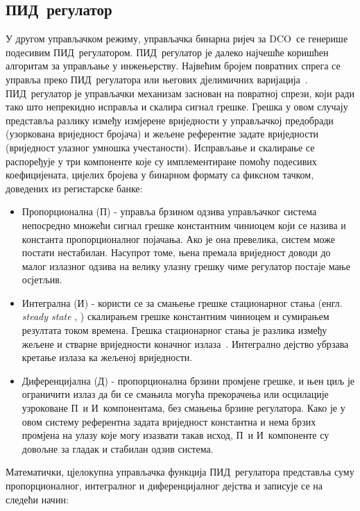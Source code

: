 \documentclass[master]{finthesis}
\makeatletter
\newcommand*{\engl}[2][\@empty]{%
    \edef\theacronym{#1}%
    (енгл. \foreignlanguage{english}{\emph{#2}%
    \ifx\theacronym\@empty \else , #1\fi})%
}
\def \DCO  {DCO} %
\def \PID  {ПИД} %
\def \P    {П}   %
\def \I    {И}   %
\def \D    {Д}   %
\makeatother
\begin{document}
\subsection{\PID\ регулатор} \label{section:pid}
У другом управљачком режиму, управљачка бинарна ријеч за \DCO\ се генерише подесивим \PID\ регулатором. \PID\ регулатор је далеко најчешће коришћен алгоритам за управљање у инжењерству. Највећим бројем повратних спрега се управља преко \PID\ регулатора или његових дјелимичних варијација~\cite{Astrom:PID_1995}. \PID\ регулатор је управљачки механизам заснован на повратној спрези, који ради тако што непрекидно исправља и скалира сигнал грешке. Грешка у овом случају представља разлику између измјерене вриједности у управљачкој предобради (узоркована вриједност бројача) и жељене референтне задате вриједности (вриједност улазног умношка учестаности). Исправљање и скалирање се распоређује у три компоненте које су имплементиране помоћу подесивих коефицијената, цијелих бројева у бинарном формату са фиксном тачком, доведених из регистарске банке: 
\begin{itemize}
	\item Пропорционална (\P) - управља брзином одзива управљачког система непосредно множећи сигнал грешке константним чиниоцем који се назива и константа пропорционалног појачања. Ако је она превелика, систем може постати нестабилан. Насупрот томе, њена премала вриједност доводи до малог излазног одзива на велику улазну грешку чиме регулатор постаје мање осјетљив. 
	\item Интегрална (\I) - користи се за смањење грешке стационарног стања \engl{steady state} скалирањем грешке константним чиниоцем и сумирањем резултата током времена. Грешка стационарног стања је разлика између жељене и стварне вриједности коначног излаза~\cite{Liptak:PROCESS_CONTROL_2006}. Интегрално дејство убрзава кретање излаза ка жељеној вриједности.
	\item Диференцијална (\D) - пропорционална брзини промјене грешке, и њен циљ је ограничити излаз да би се смањила могућа прекорачења или осцилације узроковане \P\ и \I\ компонентама, без смањења брзине регулатора. Како је у овом систему референтна задата вриједност константна и нема брзих промјена на улазу које могу изазвати такав исход, \P\ и \I\ компоненте су довољне за гладак и стабилан одзив система. \par
\end{itemize}
Математички, цјелокупна управљачка функција \PID\ регулатора представља суму пропорционалног, интегралног и диференцијалног дејства и записује се на следећи начин:
\end{document}
